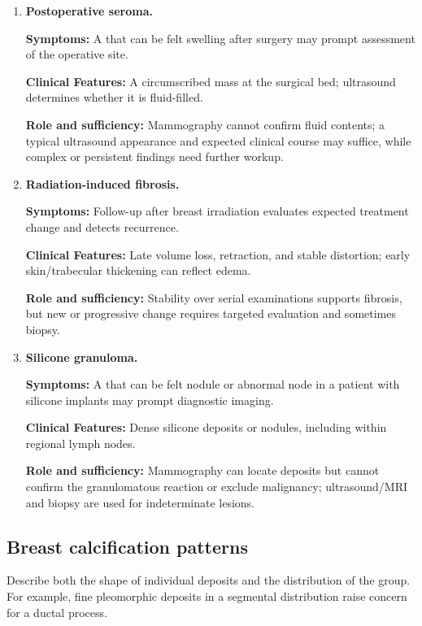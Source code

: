 \begin{enumerate}[leftmargin=*,itemsep=0.45em,topsep=0.4em]
\item \textbf{Postoperative seroma.}\par\noindent\textbf{Symptoms:} A that can be felt swelling after surgery may prompt assessment of the operative site.\par\noindent\textbf{Clinical Features:} A circumscribed mass at the surgical bed; ultrasound determines whether it is fluid-filled.\par\noindent\textbf{Role and sufficiency:} Mammography cannot confirm fluid contents; a typical ultrasound appearance and expected clinical course may suffice, while complex or persistent findings need further workup.
\item \textbf{Radiation-induced fibrosis.}\par\noindent\textbf{Symptoms:} Follow-up after breast irradiation evaluates expected treatment change and detects recurrence.\par\noindent\textbf{Clinical Features:} Late volume loss, retraction, and stable distortion; early skin/trabecular thickening can reflect edema.\par\noindent\textbf{Role and sufficiency:} Stability over serial examinations supports fibrosis, but new or progressive change requires targeted evaluation and sometimes biopsy.
\item \textbf{Silicone granuloma.}\par\noindent\textbf{Symptoms:} A that can be felt nodule or abnormal node in a patient with silicone implants may prompt diagnostic imaging.\par\noindent\textbf{Clinical Features:} Dense silicone deposits or nodules, including within regional lymph nodes.\par\noindent\textbf{Role and sufficiency:} Mammography can locate deposits but cannot confirm the granulomatous reaction or exclude malignancy; ultrasound/MRI and biopsy are used for indeterminate lesions.
\end{enumerate}

\subsection{Breast calcification patterns}
Describe both the shape of individual deposits and the distribution of the group. For example, fine pleomorphic deposits in a segmental distribution raise concern for a ductal process.

